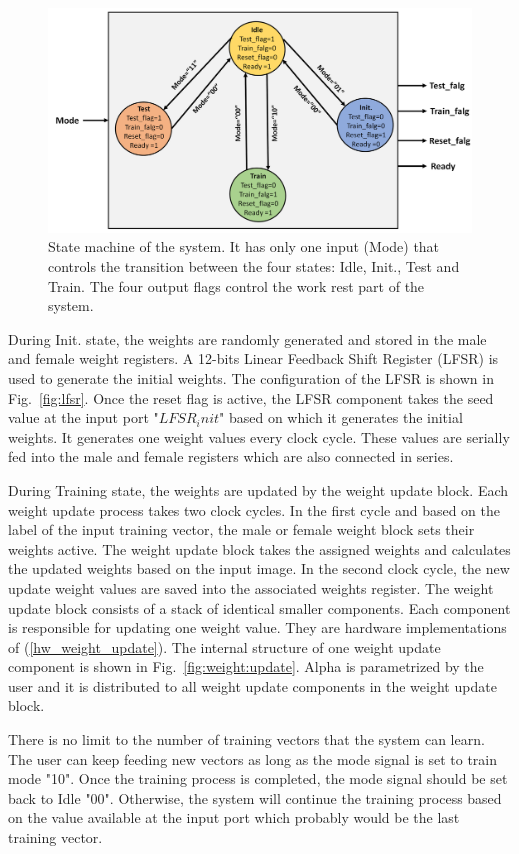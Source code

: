 \documentclass[10pt,journal]{IEEEtran}
\newcommand{\fig}[1]{Fig.~\ref{#1}}
\newcommand{\eq}[1]{(\ref{#1})}
\begin{document}
	\begin{figure}
				\centering
				\includegraphics[width=0.8\linewidth]{State_machine}
				\caption{State machine of the system. It has only one input (Mode) that controls the transition between the four states: Idle, Init., Test and Train. The four output flags control the work rest part of the system.}
				\label{fig:state:machine}
			\end{figure}
			
			
During Init. state, the weights are randomly generated and stored in the male and female weight registers. A 12-bits Linear Feedback Shift Register (LFSR) is used to generate the initial weights. The configuration of the LFSR is shown in \fig{fig:lfsr}. Once the reset flag is active, the LFSR component takes the seed value at the input port "$LFSR_init$" based on which it generates the initial weights. It generates one weight values every clock cycle. These values are serially fed into the male and female registers which are also connected in series. 

During Training state, the weights are updated by the weight update block. Each weight update process takes two clock cycles. In the first cycle and based on the label of the input training vector, the male or female weight block sets their weights active. The weight update block takes the assigned weights and calculates the updated weights based on the input image. In the second clock cycle, the new update weight values are saved into the associated weights register. The weight update block consists of a stack of identical smaller components. Each component is responsible for updating one weight value. They are hardware implementations of \eq{hw_weight_update}. The internal structure of one weight update component is shown in \fig{fig:weight:update}. Alpha is parametrized by the user and it is distributed to all weight update components in the weight update block. 

There is no limit to the number of training vectors that the system can learn. The user can keep feeding new vectors as long as the mode signal is set to train mode "10". Once the training process is completed, the mode signal should be set back to Idle "00". Otherwise, the system will continue the training process based on the value available at the input port which probably would be the last training vector. 
\end{document}
